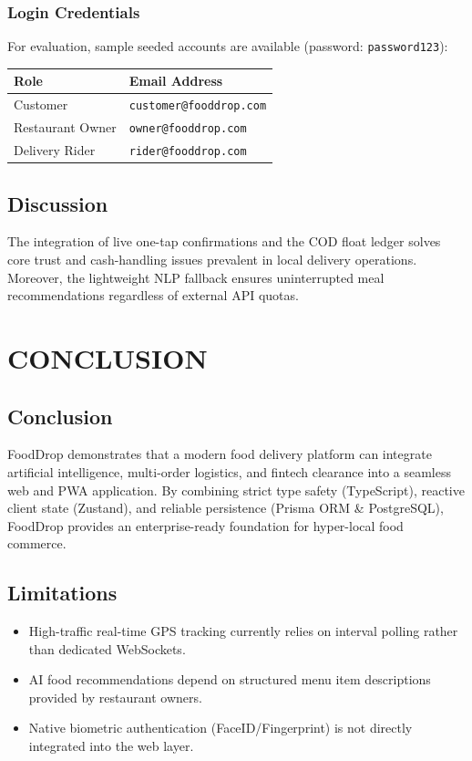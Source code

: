 \documentclass[12pt,a4paper]{report}
\begin{document}
\subsection{Login Credentials}
For evaluation, sample seeded accounts are available (password: \texttt{password123}):
\begin{table}[h!]
\centering
\begin{tabular}{|l|l|}
\hline
\textbf{Role} & \textbf{Email Address} \\
\hline
Customer & \texttt{customer@fooddrop.com} \\
\hline
Restaurant Owner & \texttt{owner@fooddrop.com} \\
\hline
Delivery Rider & \texttt{rider@fooddrop.com} \\
\hline
\end{tabular}
\end{table}

\section{Discussion}
The integration of live one-tap confirmations and the COD float ledger solves core trust and cash-handling issues prevalent in local delivery operations. Moreover, the lightweight NLP fallback ensures uninterrupted meal recommendations regardless of external API quotas.

\newpage

\chapter{CONCLUSION}

\section{Conclusion}
FoodDrop demonstrates that a modern food delivery platform can integrate artificial intelligence, multi-order logistics, and fintech clearance into a seamless web and PWA application. By combining strict type safety (TypeScript), reactive client state (Zustand), and reliable persistence (Prisma ORM \& PostgreSQL), FoodDrop provides an enterprise-ready foundation for hyper-local food commerce.

\section{Limitations}
\begin{itemize}
    \item High-traffic real-time GPS tracking currently relies on interval polling rather than dedicated WebSockets.
    \item AI food recommendations depend on structured menu item descriptions provided by restaurant owners.
    \item Native biometric authentication (FaceID/Fingerprint) is not directly integrated into the web layer.
\end{itemize}
\end{document}
